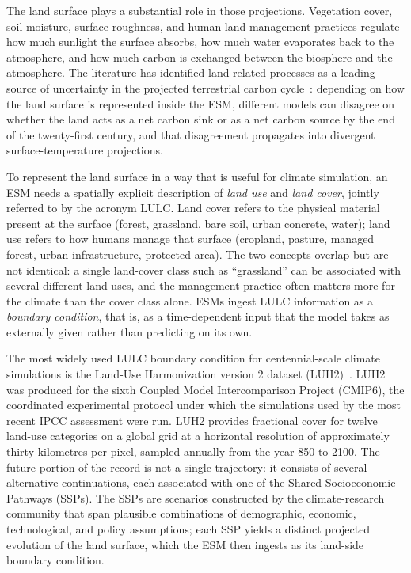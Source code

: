 \documentclass[12pt,a4paper]{article}
\begin{document}
The land surface plays a substantial role in those projections. Vegetation cover, soil
moisture, surface roughness, and human land-management practices regulate how much sunlight
the surface absorbs, how much water evaporates back to the atmosphere, and how much carbon is
exchanged between the biosphere and the atmosphere. The literature has identified land-related
processes as a leading source of uncertainty in the projected terrestrial carbon
cycle~\cite{booth2012carbon,gier2024carbon}: depending on how the land surface is represented
inside the ESM, different models can disagree on whether the land acts as a net carbon sink
or as a net carbon source by the end of the twenty-first century, and that disagreement
propagates into divergent surface-temperature projections.

To represent the land surface in a way that is useful for climate simulation, an ESM needs a
spatially explicit description of \emph{land use} and \emph{land cover}, jointly referred to
by the acronym LULC. Land cover refers to the physical material present at the surface
(forest, grassland, bare soil, urban concrete, water); land use refers to how humans manage
that surface (cropland, pasture, managed forest, urban infrastructure, protected area). The
two concepts overlap but are not identical: a single land-cover class such as ``grassland'' can
be associated with several different land uses, and the management practice often matters more
for the climate than the cover class alone. ESMs ingest LULC information as a \emph{boundary
condition}, that is, as a time-dependent input that the model takes as externally given rather
than predicting on its own.

The most widely used LULC boundary condition for centennial-scale climate simulations is the
Land-Use Harmonization version 2 dataset (LUH2)~\cite{hurtt2020luh2}. LUH2 was produced for
the sixth Coupled Model Intercomparison Project (CMIP6), the coordinated experimental
protocol under which the simulations used by the most recent IPCC assessment were run. LUH2
provides fractional cover for twelve land-use categories on a global grid at a horizontal
resolution of approximately thirty kilometres per pixel, sampled annually from the year 850 to
2100. The future portion of the record is not a single trajectory: it consists of several
alternative continuations, each associated with one of the Shared Socioeconomic Pathways
(SSPs). The SSPs are scenarios constructed by the climate-research community that span
plausible combinations of demographic, economic, technological, and policy assumptions; each
SSP yields a distinct projected evolution of the land surface, which the ESM then ingests as
its land-side boundary condition.
\end{document}
